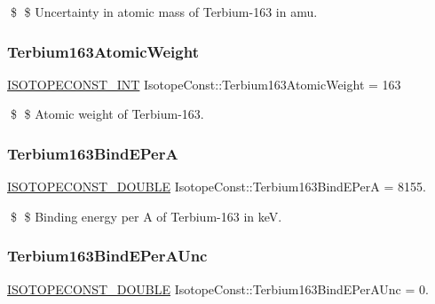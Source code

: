 \$ \$ Uncertainty in atomic mass of Terbium-\/163 in amu. \mbox{\label{group___isotope_const-_terbium-_tb163_gaccbcab308eeb534b984125aaff58ea1b}} 
\subsubsection{\texorpdfstring{Terbium163\+Atomic\+Weight}{Terbium163AtomicWeight}}
{\footnotesize\ttfamily \mbox{\hyperlink{group___isotope_const-_macros_ga5f18360b3e99483a35c32d789e62621c}{I\+S\+O\+T\+O\+P\+E\+C\+O\+N\+S\+T\+\_\+\+I\+NT}} Isotope\+Const\+::\+Terbium163\+Atomic\+Weight = 163}

\$ \$ Atomic weight of Terbium-\/163. \mbox{\label{group___isotope_const-_terbium-_tb163_ga4ca59b4e7c4ae5e43aeb5fe38ff2a930}} 
\subsubsection{\texorpdfstring{Terbium163\+Bind\+E\+PerA}{Terbium163BindEPerA}}
{\footnotesize\ttfamily \mbox{\hyperlink{group___isotope_const-_macros_ga8f45a7272ce02c0b4c65c44636ed719a}{I\+S\+O\+T\+O\+P\+E\+C\+O\+N\+S\+T\+\_\+\+D\+O\+U\+B\+LE}} Isotope\+Const\+::\+Terbium163\+Bind\+E\+PerA = 8155.}

\$ \$ Binding energy per A of Terbium-\/163 in keV. \mbox{\label{group___isotope_const-_terbium-_tb163_gac9e6e597b0baa75751ce64e10a65945d}} 
\subsubsection{\texorpdfstring{Terbium163\+Bind\+E\+Per\+A\+Unc}{Terbium163BindEPerAUnc}}
{\footnotesize\ttfamily \mbox{\hyperlink{group___isotope_const-_macros_ga8f45a7272ce02c0b4c65c44636ed719a}{I\+S\+O\+T\+O\+P\+E\+C\+O\+N\+S\+T\+\_\+\+D\+O\+U\+B\+LE}} Isotope\+Const\+::\+Terbium163\+Bind\+E\+Per\+A\+Unc = 0.}

